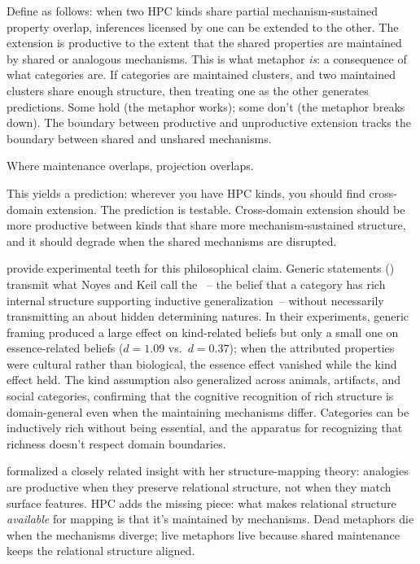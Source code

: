 Define  as follows: when two HPC kinds share partial mechanism-sustained property overlap, inferences licensed by one can be extended to the other. The extension is productive to the extent that the shared properties are maintained by shared or analogous mechanisms. This is what metaphor \emph{is}: a consequence of what categories are. If categories are maintained clusters, and two maintained clusters share enough structure, then treating one as the other generates predictions. Some hold (the metaphor works); some don't (the metaphor breaks down). The boundary between productive and unproductive extension tracks the boundary between shared and unshared mechanisms.

Where maintenance overlaps, projection overlaps.

This yields a prediction: wherever you have HPC kinds, you should find cross-domain extension. The prediction is testable. Cross-domain extension should be more productive between kinds that share more mechanism-sustained structure, and it should degrade when the shared mechanisms are disrupted.

\textcite{noyes2019} provide experimental teeth for this philosophical claim. Generic statements () transmit what Noyes and Keil call the ~-- the belief that a category has rich internal structure supporting inductive generalization~-- without necessarily transmitting an  about hidden determining natures. In their experiments, generic framing produced a large effect on kind-related beliefs but only a small one on essence-related beliefs ($d = 1.09$ vs.\ $d = 0.37$); when the attributed properties were cultural rather than biological, the essence effect vanished while the kind effect held. The kind assumption also generalized across animals, artifacts, and social categories, confirming that the cognitive recognition of rich structure is domain-general even when the maintaining mechanisms differ. Categories can be inductively rich without being essential, and the apparatus for recognizing that richness doesn't respect domain boundaries.

\textcite{gentner1983} formalized a closely related insight with her structure-mapping theory: analogies are productive when they preserve relational structure, not when they match surface features. HPC adds the missing piece: what makes relational structure \emph{available} for mapping is that it's maintained by mechanisms. Dead metaphors die when the mechanisms diverge; live metaphors live because shared maintenance keeps the relational structure aligned.

